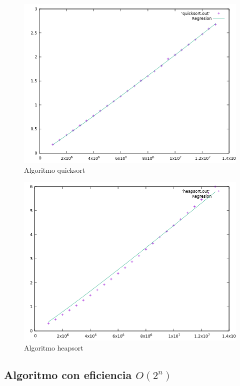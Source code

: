 \documentclass[12pt,spanish]{article}
\begin{document}
\begin{figure}[H]
\centering
\includegraphics[scale=0.75]{hibrida_quicksort.png}
\caption{Algoritmo quicksort}
\end{figure}

\begin{figure}[H]
\centering
\includegraphics[scale=0.75]{hibrida_heapsort.png}
\caption{Algoritmo heapsort}
\end{figure}

\subsection{Algoritmo con eficiencia $O(2^n)$}
\end{document}
